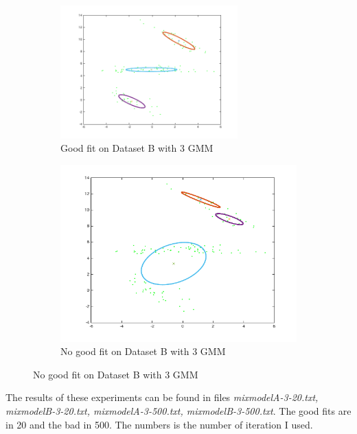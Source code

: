 \begin{figure}[ht]
\begin{subfigure}[b]{0.5\linewidth}
    \centering
    \includegraphics[width=0.75\textwidth]{figures/mixmodelB_3_20.png}
    \caption{Good fit on Dataset B with 3 GMM}
    \vspace{4ex}
 \end{subfigure}%
  \begin{subfigure}[b]{0.5\linewidth}
  \centering
\includegraphics[width=0.75\linewidth]{figures/mixmodelB_3_500.png}
\caption{No good fit on Dataset B with 3 GMM}
\vspace{4ex}
\end{subfigure}%
\end{figure}
The results of these experiments can be found in files \textit{mixmodelA-3-20.txt, mixmodelB-3-20.txt, mixmodelA-3-500.txt,
mixmodelB-3-500.txt}. The good fits are in 20 and the bad in 500. The numbers is the number of iteration I used.
%
